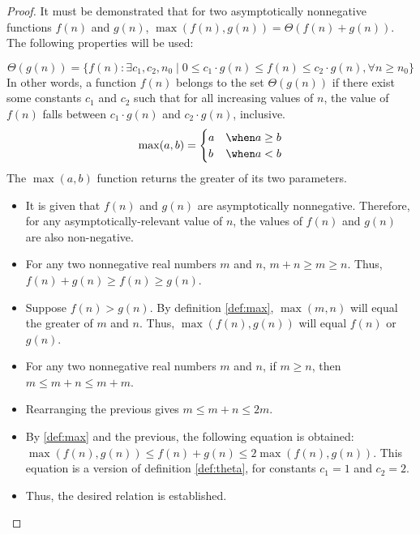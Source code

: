 
\begin{proof}
It must be demonstrated that for two asymptotically nonnegative functions $f(n)$ and $g(n)$, $\max( f(n), g(n) ) = \Theta(f(n) + g(n))$. 
The following properties will be used:
\begin{enumerate}
		\begin{equation*}
			\Theta(g(n)) = \{ f(n) : \exists c_1, c_2, n_0 \mid 0 \leq c_1 \cdot g(n) \leq f(n) \leq c_2 \cdot g(n), \forall n \geq n_0 \}
		\end{equation*}
		In other words, a function $ f(n) $ belongs to the set $\Theta(g(n))$ if there exist some constants $c_1$ and $c_2$ such that for 
all increasing values of $n$, the value of $f(n)$ falls between $c_1 \cdot g(n)$ and $c_2 \cdot g(n)$, inclusive.
		\begin{equation*}
			\max(a, b) =
			\begin{cases} a & \when a \geq b \\ b & \when a < b \end{cases}
		\end{equation*}
		The $\max(a,b)$ function returns the greater of its two parameters.
\end{enumerate}
\begin{itemize}
	\item It is given that $f(n)$ and $g(n)$ are asymptotically nonnegative. Therefore, for any asymptotically-relevant value of $n$, the values of $f(n)$ and $g(n)$ are also non-negative.
	\item For any two nonnegative real numbers $m$ and $n$, $ m+n \geq m \geq n$. Thus, $f(n) + g(n) \geq f(n) \geq g(n)$.
	\item Suppose $f(n) > g(n)$. By definition \ref{def:max}, $\max(m, n)$ will equal the greater of $m$ and $n$. Thus, $\max(f(n), g(n))$ will equal $f(n)$ or $g(n)$.
	\item For any two nonnegative real numbers $m$ and $n$, if $m \geq n$, then $m \leq m + n \leq m + m$.
	\item Rearranging the previous gives $m \leq m + n \leq 2m$.
	\item By \ref{def:max} and the previous, the following equation is obtained: $\max(f(n), g(n)) \leq f(n) + g(n) \leq 2\max(f(n), g(n))$. This equation is a version of definition \ref{def:theta}, for constants $c_1 = 1$ and $c_2 = 2$.
	\item Thus, the desired relation is established.
\end{itemize}
\end{proof}